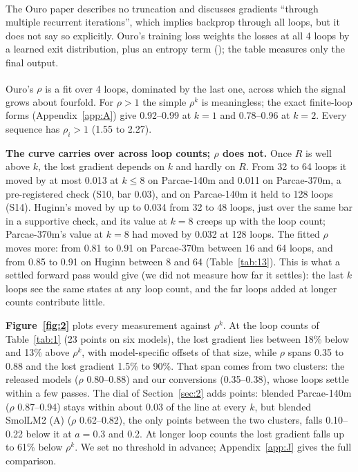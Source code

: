 \documentclass[10pt]{article}
\begin{document}
\begin{table}[t]
\textsuperscript{\dag} The Ouro paper describes no truncation and discusses gradients ``through multiple recurrent iterations'', which implies backprop through all loops, but it does not say so explicitly. Ouro's training loss weights the losses at all 4 loops by a learned exit distribution, plus an entropy term (\citealp[Eq.~4]{zhu2025ouro}); the table measures only the final output.

\textsuperscript{\ddag} Ouro's $\rho$ is a fit over 4 loops, dominated by the last one, across which the signal grows about fourfold. For $\rho > 1$ the simple $\rho^{k}$ is meaningless; the exact finite-loop forms (Appendix~\ref{app:A}) give 0.92--0.99 at $k = 1$ and 0.78--0.96 at $k = 2$. Every sequence has $\rho_i > 1$ (1.55 to 2.27).
\label{tab:1}
\end{table}


\textbf{The curve carries over across loop counts; $\rho$ does not.} Once $R$ is well above $k$, the lost gradient depends on $k$ and hardly on $R$. From 32 to 64 loops it moved by at most 0.013 at $k \leq  8$ on Parcae-140m and 0.011 on Parcae-370m, a pre-registered check (S10, bar 0.03), and on Parcae-140m it held to 128 loops (S14). Huginn's moved by up to 0.034 from 32 to 48 loops, just over the same bar in a supportive check, and its value at $k = 8$ creeps up with the loop count; Parcae-370m's value at $k = 8$ had moved by 0.032 at 128 loops. The fitted $\rho$ moves more: from 0.81 to 0.91 on Parcae-370m between 16 and 64 loops, and from 0.85 to 0.91 on Huginn between 8 and 64 (Table~\ref{tab:13}). This is what a settled forward pass would give (we did not measure how far it settles): the last $k$ loops see the same states at any loop count, and the far loops added at longer counts contribute little.

\textbf{Figure~\ref{fig:2}} plots every measurement against $\rho^{k}$. At the loop counts of Table~\ref{tab:1} (23 points on six models), the lost gradient lies between 18\% below and 13\% above $\rho^{k}$, with model-specific offsets of that size, while $\rho$ spans 0.35 to 0.88 and the lost gradient 1.5\% to 90\%. That span comes from two clusters: the released models ($\rho$ 0.80--0.88) and our conversions (0.35--0.38), whose loops settle within a few passes. The dial of Section~\ref{sec:2} adds points: blended Parcae-140m ($\rho$ 0.87--0.94) stays within about 0.03 of the line at every $k$, but blended SmolLM2 (A) ($\rho$ 0.62--0.82), the only points between the two clusters, falls 0.10--0.22 below it at $a = 0.3$ and 0.2. At longer loop counts the lost gradient falls up to 61\% below $\rho^{k}$. We set no threshold in advance; Appendix~\ref{app:J} gives the full comparison.
\end{document}
